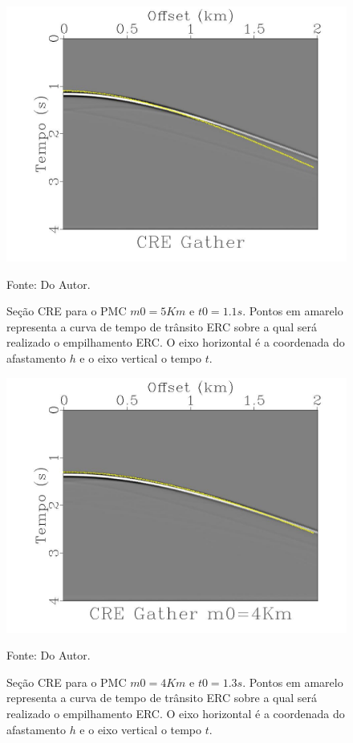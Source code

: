 \begin{figure}
\caption{Seção CRE para o PMC $m0=5Km$ e $t0=1.1s$.
Pontos em amarelo representa a curva de tempo de trânsito ERC sobre a qual
será realizado o empilhamento ERC.
O eixo horizontal é a coordenada do afastamento $h$ e o eixo vertical o tempo
$t$.}
\begin{center}
\includegraphics[scale=0.3]{images/interpolacao5.jpeg}
\vspace{-0.3cm}
\end{center}
\begin{center}
 Fonte: Do Autor.
\end{center}
\label{fig:6.1}
\end{figure}

\begin{figure}
\caption{Seção CRE para o PMC $m0=4Km$ e $t0=1.3s$.
Pontos em amarelo representa a curva de tempo de trânsito ERC sobre a qual
será realizado o empilhamento ERC.
O eixo horizontal é a coordenada do afastamento $h$ e o eixo vertical o tempo
$t$.}
\begin{center}
\includegraphics[scale=0.3]{images/interpolacao4.jpeg}
\vspace{-0.3cm}
\end{center}
\begin{center}
 Fonte: Do Autor.
\end{center}
\label{fig:6.2}
\end{figure}

